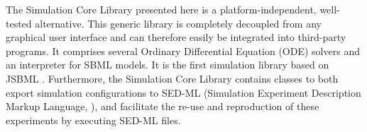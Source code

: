 \documentclass{bioinfo}
\begin{document}

The Simulation Core Library presented here is a platform-independent,
well-tested alternative.
This generic library is completely decoupled from any graphical user interface
and can therefore easily be integrated into third-party programs.
It comprises several Ordinary Differential Equation (ODE)
solvers and an interpreter for SBML models. It is the first simulation library
based on JSBML \citep{Draeger2011b}. 
%
%
Furthermore, the Simulation Core Library contains classes to both export
simulation configurations to SED-ML (Simulation Experiment Description Markup Language,
\citealp{Waltemath2011}), and facilitate the re-use and reproduction of these
experiments by executing SED-ML files.
\end{document}
